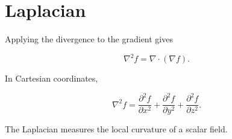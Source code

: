 \section{Laplacian}

Applying the divergence to the gradient gives

\[
\boxed{
	\nabla^2f
	=
	\nabla\cdot(\nabla f).
}
\]

In Cartesian coordinates,

\[
\boxed{
	\nabla^2f
	=
	\frac{\partial^2f}{\partial x^2}
	+
	\frac{\partial^2f}{\partial y^2}
	+
	\frac{\partial^2f}{\partial z^2}.
}
\]

The Laplacian measures the local curvature of a scalar field.

